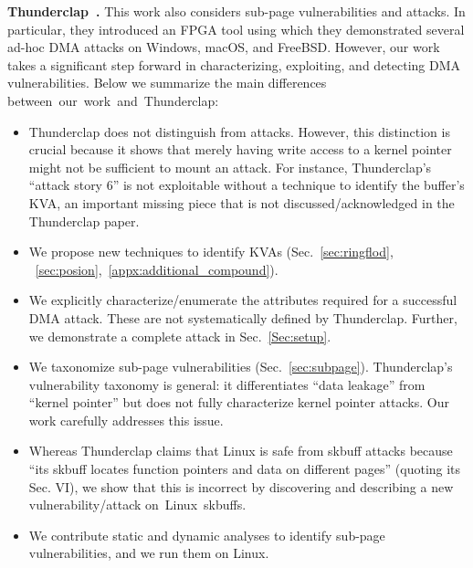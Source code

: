 \smallskip
\noindent\textbf{Thunderclap~\cite{thunder}.} This work also considers sub-page vulnerabilities and \simple attacks. In particular, they introduced an FPGA tool using which they demonstrated several ad-hoc \simple DMA attacks on Windows, macOS, and FreeBSD. However, our work takes a significant step forward in characterizing, exploiting, and detecting DMA vulnerabilities. Below we summarize the main differences \mbox{between our work and Thunderclap:}
\begin{itemize}

    \item Thunderclap does not distinguish \simple from \compound attacks. However, this distinction is crucial because it shows that merely having write access to a kernel pointer might not be sufficient to mount an attack. For instance, Thunderclap's ``attack story 6'' is not exploitable without a technique to identify the buffer's KVA, an important missing piece that is not discussed/acknowledged in the Thunderclap paper.
    
    \item We propose new techniques to identify KVAs (Sec.~\ref{sec:ringflod}, ~\ref{sec:posion},~\ref{appx:additional_compound}).
    
    \item We explicitly characterize/enumerate the attributes required for a successful DMA attack. These are not systematically defined by Thunderclap. Further, we demonstrate a complete \compound attack in Sec.~\ref{Sec:setup}.
    
    \item We taxonomize sub-page vulnerabilities (Sec.~\ref{sec:subpage}). Thunderclap's vulnerability taxonomy is general: it differentiates ``data leakage'' from ``kernel pointer'' but does not fully characterize kernel pointer attacks. Our work carefully addresses this issue.
    
    \item Whereas Thunderclap claims that Linux is safe from skbuff attacks because ``its skbuff locates function pointers and data on different pages'' (quoting its Sec. VI), we show that this is incorrect by discovering and describing a new vulnerability/attack \mbox{on Linux skbuffs.}
    
    \item We contribute static and dynamic analyses to identify sub-page vulnerabilities, and we run them on Linux.
    
\end{itemize}





